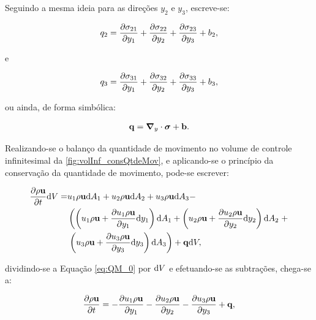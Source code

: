 Seguindo a mesma ideia para as direções $y_2$ e $y_3$, escreve-se:

\begin{align}
	q_2 =\frac{\partial \sigma_{21}}{\partial y_1} + \frac{\partial \sigma_{22}}{\partial y_2} + \frac{\partial \sigma_{23}}{\partial y_3} + b_{2},
\end{align}	

\noindent e

\begin{align}
	q_3 =\frac{\partial \sigma_{31}}{\partial y_1} + \frac{\partial \sigma_{32}}{\partial y_2} + \frac{\partial \sigma_{33}}{\partial y_3} + b_{3},
\end{align}

\noindent ou ainda, de forma simbólica:

\begin{align}
	\mathbf{q} = \boldsymbol{\nabla}_y \cdot \boldsymbol{\sigma} + \mathbf{b}.
\end{align}

Realizando-se o balanço da quantidade de movimento no volume de controle infinitesimal da \autoref{fig:volInf_consQtdeMov}, e aplicando-se o princípio da conservação da quantidade de movimento, pode-se escrever:

\begin{align}
	\begin{split}
	\frac{\partial \rho \mathbf{u}}{\partial t}\mathrm{d} V =& u_1\rho \mathbf{u} \mathrm{d} A_1 + u_2\rho \mathbf{u} \mathrm{d} A_2 + u_3 \rho \mathbf{u} \mathrm{d} A_3 - \\
	 & \left(\left(u_1 \rho \mathbf{u} + \frac{\partial u_1 \rho \mathbf{u}}{\partial y_1}\mathrm{d} y_1 \right)\mathrm{d} A_1 + \left(u_2 \rho \mathbf{u} + \frac{\partial u_2 \rho \mathbf{u}}{\partial y_2}\mathrm{d} y_2 \right)\mathrm{d} A_2 \right. + \\ & \left.   \left(u_3 \rho \mathbf{u} + \frac{\partial u_3 \rho \mathbf{u}}{\partial y_3}\mathrm{d} y_3 \right)\mathrm{d} A_3\right) + \mathbf{q} \mathrm{d} V,
	\label{eq:QM_0} 
	\end{split}
\end{align}	

\noindent dividindo-se a Equação \eqref{eq:QM_0} por $\mathrm{d} V$ e efetuando-se as subtrações, chega-se a:

\begin{align}
		\frac{\partial \rho \mathbf{u}}{\partial t} = 
		-\frac{\partial u_1 \rho \mathbf{u}}{\partial y_1} 
		-\frac{\partial u_2 \rho \mathbf{u}}{\partial y_2}  
		-\frac{\partial u_3 \rho \mathbf{u}}{\partial y_3} + \mathbf{q},
		\label{eq:QM_1} 
\end{align}

